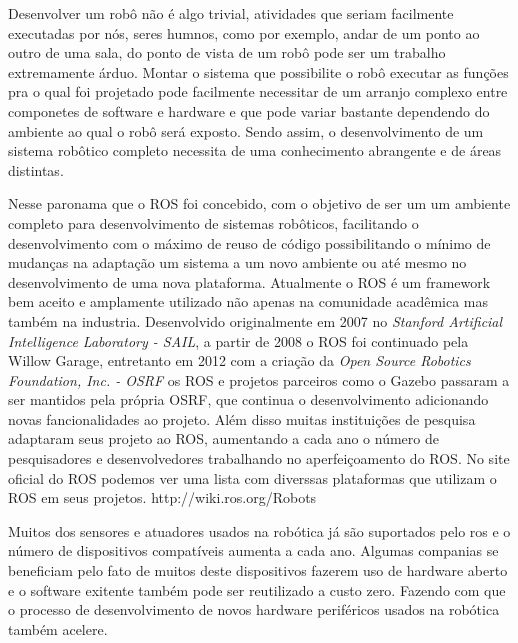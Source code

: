 
Desenvolver um robô não é algo trivial, atividades que seriam facilmente executadas por nós, seres humnos, como por exemplo, andar de um ponto ao outro de uma sala, do ponto de vista de um robô pode ser um trabalho extremamente árduo. Montar o sistema que possibilite o robô executar as funções pra o qual foi projetado pode facilmente necessitar de um arranjo complexo entre componetes de software e hardware e que pode variar bastante dependendo do ambiente ao qual o robô será exposto. Sendo assim, o desenvolvimento de um sistema robôtico completo necessita de uma conhecimento abrangente e de áreas distintas.  

Nesse paronama que o ROS foi concebido, com o objetivo de  ser um um ambiente completo para desenvolvimento de sistemas robôticos, facilitando o desenvolvimento com o máximo de reuso de código possibilitando o mínimo de mudanças na adaptação um sistema a um novo ambiente ou até mesmo no desenvolvimento de uma nova plataforma. Atualmente o ROS é um framework bem aceito e amplamente utilizado não apenas na comunidade acadêmica mas também na industria. Desenvolvido originalmente em 2007 no \textit{Stanford Artificial Intelligence Laboratory - SAIL}, a partir de 2008 o ROS foi continuado pela Willow Garage, entretanto em 2012 com a criação da \textit{Open Source Robotics Foundation, Inc. - OSRF} os ROS e projetos parceiros como o Gazebo passaram a ser mantidos pela própria OSRF, que continua o desenvolvimento adicionando novas fancionalidades ao projeto. Além disso muitas instituições de pesquisa adaptaram seus projeto ao ROS, aumentando a cada ano o número de pesquisadores e desenvolvedores trabalhando no aperfeiçoamento do ROS. No site oficial do ROS podemos ver uma lista com diverssas plataformas que utilizam o ROS em seus projetos. http://wiki.ros.org/Robots

Muitos dos sensores e atuadores usados na robótica já são suportados pelo ros e o número de dispositivos compatíveis aumenta a cada ano. Algumas companias se beneficiam pelo fato de muitos deste dispositivos fazerem uso de hardware aberto e o software exitente também pode ser reutilizado a custo zero. Fazendo com que o processo de desenvolvimento de novos hardware periféricos usados na robótica também acelere.





